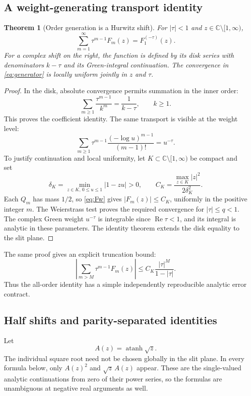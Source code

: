 \documentclass[11pt]{article}
\numberwithin{equation}{section}
\newtheorem{theorem}{Theorem}[section]
\theoremstyle{definition}
\theoremstyle{remark}
\DeclareMathOperator{\Ren}{Re}
\DeclareMathOperator{\atanh}{atanh}
\newcommand{\C}{\mathbb C}
\newcommand{\cut}{\C\setminus[1,\infty)}
\begin{document}
\subsection{A weight-generating transport identity}
\begin{theorem}[Order generation is a Hurwitz shift]\label{thm:generator}
For $|\tau|<1$ and $z\in\cut$,
\begin{equation}\label{eq:generator}
 \sum_{m=1}^{\infty}\tau^{m-1}F_m(z)=F_1^{(-\tau)}(z).
\end{equation}
For a complex shift on the right, the function is defined by its disk
series with denominators $k-\tau$ and its Green-integral continuation.
The convergence in \eqref{eq:generator} is locally uniform jointly in
$z$ and $\tau$.
\end{theorem}
\begin{proof}
In the disk, absolute convergence permits summation in the inner order:
\[
 \sum_{m\ge1}\frac{\tau^{m-1}}{k^m}=\frac1{k-\tau},\qquad k\ge1.
\]
This proves the coefficient identity. The same transport is visible
at the weight level:
\[
 \sum_{m\ge1}\tau^{m-1}\frac{(-\log u)^{m-1}}{(m-1)!}
                    =u^{-\tau}.
\]
To justify continuation and local uniformity, let $K\subset\cut$ be
compact and set
\[
 \delta_K=\min_{z\in K,\,0\le u\le1}|1-zu|>0,
 \qquad C_K=\frac{\max_{z\in K}|z|^2}{2\delta_K^2}.
\]
Each $Q_m$ has mass $1/2$, so \eqref{eq:Fw} gives
$|F_m(z)|\le C_K$, uniformly in the positive integer $m$. The
Weierstrass test proves the required convergence for $|\tau|\le q<1$.
The complex Green weight $u^{-\tau}$ is integrable since
$\Ren\tau<1$, and its integral is analytic in these parameters.
The identity theorem extends the disk equality to the slit plane.
\end{proof}

The same proof gives an explicit truncation bound:
\begin{equation}\label{eq:gentail}
 \left|\sum_{m>M}\tau^{m-1}F_m(z)\right|
       \le C_K\frac{|\tau|^M}{1-|\tau|}.
\end{equation}
Thus the all-order identity has a simple independently reproducible
analytic error contract.

\subsection{Half shifts and parity-separated identities}
Let
\[
 A(z)=\atanh\sqrt z.
\]
The individual square root need not be chosen globally in the slit
plane. In every formula below, only $A(z)^2$ and $\sqrt z\,A(z)$
appear. These are the single-valued analytic continuations from zero
of their power series, so the formulas are unambiguous at negative
real arguments as well.
\end{document}
